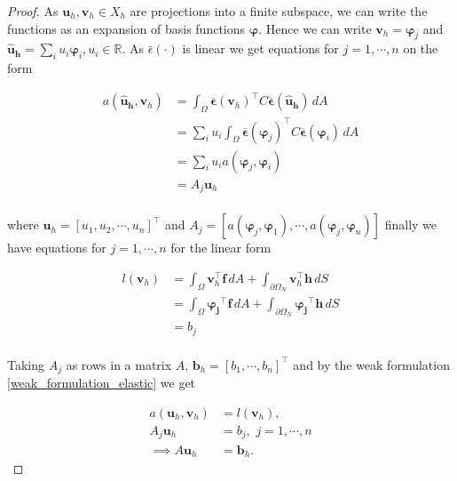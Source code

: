 \documentclass[5pt,a4paper,english]{elsarticle}%
\begin{document}
\begin{proof}
    As $\bm u_h,\bm v_h \in X_h$ are projections into a finite subspace, we can write the functions as an expansion of basis functions $\bm \varphi$. Hence we can write 
    $\bm v_h = \bm \varphi_j$ and $\bm{ \hat u_h} = \sum_i u_i \bm \varphi_i, u_i \in \mathbb{R}$. As $\bar \epsilon( \cdot )$ is linear we get equations for $j = 1,\cdots,n$ on the form

    \begin{align*}
        a(\bm{ \hat u_h},\bm v_h) &= \int_\Omega{ \boldsymbol{\overline \epsilon}(\bm v_h)^\intercal C\boldsymbol{\overline \epsilon}(\bm{ \hat u_h})} \,dA  \\
        &=\sum_i u_i  \int_\Omega{ \boldsymbol{\overline \epsilon}(\boldsymbol \varphi_j)^\intercal C  \boldsymbol{\overline \epsilon}(\boldsymbol \varphi_i)} \,dA \\
        &= \sum_i u_i a(\bm \varphi_j,\bm \varphi_i) \\
        &= A_j \bm u_h \\
    \end{align*}

    where $\bm u_h = [u_1,u_2,\cdots,u_n]^\intercal$ and $A_j = [a(\bm \varphi_j,\bm \varphi_1),\cdots,a(\bm \varphi_j,\bm \varphi_n)]$ finally we have equations for $j = 1,\cdots,n$ for the linear form

    \begin{align*}
            l(\bm v_h)&= \int_\Omega{\bm v_h^\intercal  \boldsymbol{f}} \,dA + \int_{\partial \Omega_N}{\bm v_h^\intercal \boldsymbol h} \,dS \\
            &= \int_\Omega{\boldsymbol{\varphi_j}^\intercal  \boldsymbol{f}} \,dA + \int_{\partial \Omega_N}{\boldsymbol{\varphi_j}^\intercal \boldsymbol h} \,dS \\
            &= b_j\\
    \end{align*}
    
    Taking $A_j$ as rows in a matrix $A$, $\bm b_h = [b_1,\cdots,b_n]^\intercal$ and by the weak formulation \eqref{weak_formulation_elastic} we get

    \begin{align*}
        a(\bm u_h,\bm v_h) &= l(\bm v_h), \\
        A_j \bm u_h &= b_j, \,\, j = 1,\cdots,n\\
        \implies A\bm u_h &= \bm b_h.
    \end{align*}

\end{proof}
\end{document}

